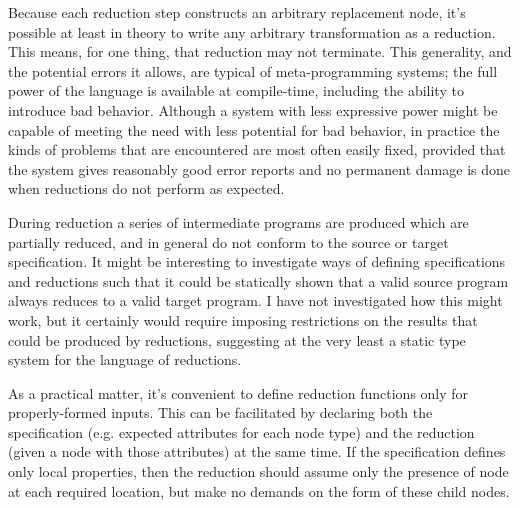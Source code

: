 Because each reduction step constructs an arbitrary replacement node, it's possible at least in theory to write any arbitrary transformation as a reduction. This means, for one thing, that reduction may not terminate. This generality, and the potential errors it allows, are typical of meta-programming systems; the full power of the language is available at compile-time, including the ability to introduce bad behavior. Although a system with less expressive power might be capable of meeting the need with less potential for bad behavior, in practice the kinds of problems that are encountered are most often easily fixed, provided that the system gives reasonably good error reports and no permanent damage is done when reductions do not perform as expected.

During reduction a series of intermediate programs are produced which are partially reduced, and in general do not conform to the source or target specification. It might be interesting to investigate ways of defining specifications and reductions such that it could be statically shown that a valid source program always reduces to a valid target program. I have not investigated how this might work, but it certainly would require imposing restrictions on the results that could be produced by reductions, suggesting at the very least a static type system for the language of reductions.

As a practical matter, it's convenient to define reduction functions only for properly-formed inputs. This can be facilitated by declaring both the specification (e.g. expected attributes for each node type) and the reduction (given a node with those attributes) at the same time. If the specification defines only local properties, then the reduction should assume only the presence of  node at each required location, but make no demands on the form of these child nodes. 




